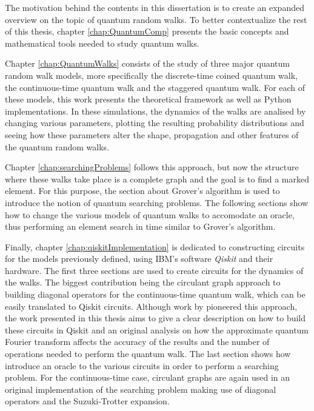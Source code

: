 \documentclass[../../dissertation.tex]{subfiles}
\begin{document}
The motivation behind the contents in this dissertation is to create an
expanded overview on  the topic of quantum random walks. To better
contextualize the rest of this thesis, chapter \ref{chap:QuantumComp} presents
the basic concepts and mathematical tools needed to study quantum walks. \par

Chapter \ref{chap:QuantumWalks} consists of the study of three major quantum
random walk models, more specifically the discrete-time coined quantum walk,
the continuous-time quantum walk and the staggered quantum walk. For each of
these models, this work presents the theoretical framework as well as Python
implementations. In these simulations, the dynamics of the walks are analised
by changing various parameters, plotting the resulting probability
distributions and seeing how these parameters alter the shape, propagation and
other features of the quantum random walks.\par

Chapter \ref{chap:searchingProblems} follows this approach, but now the
structure where these walks take place is a complete graph and the goal is to
find a marked element. For this purpose, the section about Grover's algorithm
is used to introduce the notion of quantum searching problems. The following
sections show how to change the various models of quantum walks to accomodate
an oracle, thus performing an element search in time similar to Grover's
algorithm. \par

Finally, chapter \ref{chap:qiskitImplementation} is dedicated to constructing
circuits for the models previously defined, using IBM's software
\textit{Qiskit} and their hardware. The first three sections are used to create
circuits for the dynamics of the walks. The biggest contribution being the
circulant graph approach to building diagonal operators for the continuous-time
quantum walk, which can be easily translated to Qiskit circuits. Although work
by \cite{qiang2016} pioneered this approach, the work presented in this thesis
aims to give a clear description on how to build these circuits in Qiskit and
an original analysis on how the approximate quantum Fourier transform affects
the accuracy of the results and the number of operations needed to perform the
quantum walk.
The last section shows how introduce an oracle to the various circuits in order
to perform a searching problem. For the continuous-time case, circulant graphs
are again used in an original implementation of the searching problem making
use of diagonal operators and the Suzuki-Trotter expansion.

\end{document}
